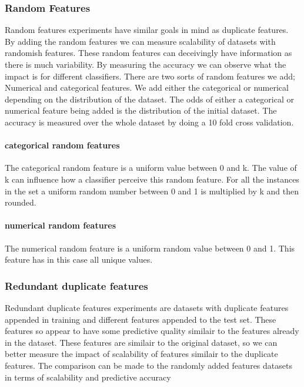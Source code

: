 \documentclass[a4paper,10pt]{article}
\begin{document}
\subsubsection{Random Features}
Random features experiments have similar goals in mind as duplicate features. By adding the random features we can measure scalability of datasets with randomish features. These random features can deceivingly have information as there is much variability. By measuring the accuracy we can observe what the impact is for different classifiers. There are two sorts of random features we add; Numerical and categorical features. We add either the categorical or numerical depending on the distribution of the dataset. The odds of either a categorical or numerical feature being added is the distribution of the initial dataset. The accuracy is measured over the whole dataset by doing a 10 fold cross validation. %


 
\paragraph{categorical random features \newline}
The categorical random feature is a uniform value between 0 and k. The value of k can influence how a classifier perceive this random feature. For all the instances in the set a uniform random number between 0 and 1 is multiplied by k and then rounded. 
\paragraph{numerical random features \newline}
The numerical random feature is a uniform random value between 0 and 1. This feature has in this case all unique values.

\subsubsection{Redundant duplicate features}
Redundant duplicate features experiments are datasets with duplicate features appended in training and different features appended to the test set. These features so appear to have some predictive quality similair to the features already in the dataset. These features are similair to the original dataset, so we can better measure the impact of scalability of features similair to the duplicate features. The comparison can be made to the randomly added features datasets in terms of scalability and predictive accuracy 
\end{document}
